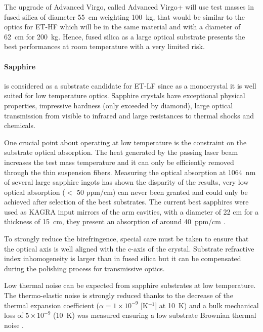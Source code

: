 The upgrade of Advanced Virgo, called Advanced Virgo+ will use test masses in fused silica of diameter 55~cm weighting 100~kg, that would be similar to the optics for ET-HF which will be in the same material and with a diameter of 62~cm for 200~kg. Hence, fused silica as a large optical substrate presents the best performances at room temperature with a very limited risk.\\


\paragraph{Sapphire} is considered as a substrate candidate for ET-LF since as a monocrystal it is well suited for low temperature optics. Sapphire crystals have exceptional physical properties, impressive hardness (only exceeded by diamond), large optical transmission from visible to infrared and large resistances to thermal shocks and chemicals.

One crucial point about operating at low temperature is the constraint on the substrate optical absorption. The heat generated by the passing laser beam increases the test mass temperature and it can only be efficiently removed through the thin suspension fibers. Measuring the optical absorption at 1064~nm of several large  sapphire ingots has shown the disparity of the results, very low optical absorption ($<$ 50 ppm/cm) can never been granted and could only be achieved after selection of the best substrates. The current best sapphires were used as KAGRA input mirrors of the arm cavities, with a diameter of 22 cm for a thickness of 15~cm, they present an absorption of around 40~ppm/cm \cite{PhysRevD.89.062003}.  

To strongly reduce the birefringence, special care must be taken to ensure that the optical axis is well aligned with the c-axis of the crystal. Substrate refractive index inhomogeneity is larger than in fused silica but it can be compensated during the polishing process for transmissive optics. 

Low thermal noise can be expected from sapphire substrates at low temperature. The thermo-elastic noise is strongly reduced thanks to the decrease of the thermal expansion coefficient ($\alpha = 1 \times 10^{-9}$ [K$^{-1}$]\cite{taylor1996measurement} at 10~K) and a bulk mechanical loss of $ 5 \times 10^{-9}$ (10~K) was measured ensuring a low substrate Brownian thermal noise \cite{uchiyama1999mechanical}.

